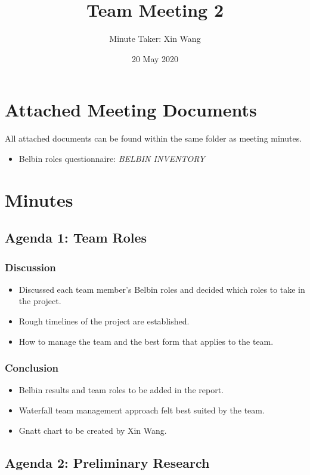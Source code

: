 \documentclass[a4paper]{article}
\author{Minute Taker: Xin Wang}
\title{Team Meeting 2}
\date{20 May 2020}
\begin{document}
\maketitle
\section{Attached Meeting Documents} 
All attached documents can be found within the same folder as meeting minutes.
\begin{itemize}
    \item Belbin roles questionnaire: \textit{BELBIN INVENTORY}
\end{itemize}

\maketitle
\section{Minutes} 
\subsection{Agenda 1: Team Roles}
\subsubsection{Discussion}
\begin{itemize}
    \item Discussed each team member's Belbin roles and decided which roles to take in the project.
    \item Rough timelines of the project are established.
    \item How to manage the team and the best form that applies to the team.
\end{itemize}
\subsubsection{Conclusion}
\begin{itemize}
    \item Belbin results and team roles to be added in the report.
    \item Waterfall team management approach felt best suited by the team.
    \item Gnatt chart to be created by Xin Wang.
\end{itemize}

\subsection{Agenda 2: Preliminary Research}
\end{document}
